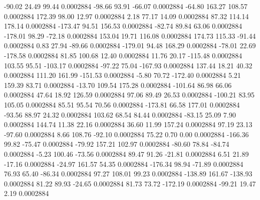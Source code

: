       -90.02       24.49       99.44     0.0002884
      -98.66       93.91      -66.07     0.0002884
      -64.80      163.27      108.57     0.0002884
      172.39       98.00       12.97     0.0002884
        2.18       77.17       14.09     0.0002884
       87.32      114.14      178.14     0.0002884
     -173.47       94.51      156.53     0.0002884
      -82.74       89.84       63.06     0.0002884
     -178.01       98.29      -72.18     0.0002884
      153.04       19.71      116.08     0.0002884
      174.73      115.33      -91.44     0.0002884
        0.83       27.94      -89.66     0.0002884
     -179.01       94.48      168.29     0.0002884
      -78.01       22.69     -178.58     0.0002884
       81.85      100.68       12.40     0.0002884
       11.76       20.17     -115.48     0.0002884
      103.55       95.51     -103.17     0.0002884
      -97.22       75.04     -167.93     0.0002884
      137.44       18.21       40.32     0.0002884
      111.20      161.99     -151.53     0.0002884
       -5.80       70.72     -172.40     0.0002884
        5.21      159.39       83.71     0.0002884
      -13.70      109.54      175.28     0.0002884
     -101.64       86.98       66.06     0.0002884
       47.64       18.92      126.59     0.0002884
       97.06       89.49       26.53     0.0002884
     -100.21       83.95      105.05     0.0002884
       85.51       95.54       70.56     0.0002884
     -173.81       66.58      177.01     0.0002884
      -93.56       88.97       24.32     0.0002884
      103.62       68.54       84.44     0.0002884
      -83.15       25.09        7.90     0.0002884
      144.74       11.38       22.16     0.0002884
       36.60       11.99      157.24     0.0002884
       97.19       23.13      -97.60     0.0002884
        8.66      108.76      -92.10     0.0002884
       75.22        0.70        0.00     0.0002884
     -166.36       99.82      -75.47     0.0002884
      -79.92      157.21      102.97     0.0002884
      -80.60       78.84      -84.74     0.0002884
       -5.23      100.46      -73.56     0.0002884
       89.47       91.26      -21.81     0.0002884
        6.51       21.89      -17.16     0.0002884
      -24.97      161.57       54.35     0.0002884
     -176.34       98.94      -71.89     0.0002884
       76.93       65.40      -86.34     0.0002884
       97.27      108.01       99.23     0.0002884
     -138.89      161.67     -138.93     0.0002884
       81.22       89.93      -24.65     0.0002884
       81.73       73.72     -172.19     0.0002884
      -99.21       19.47        2.19     0.0002884
